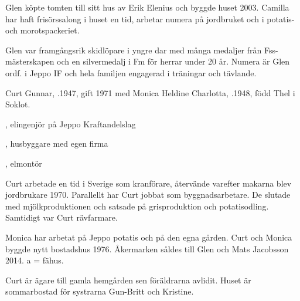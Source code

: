 Glen köpte tomten till sitt hus av Erik Elenius och byggde huset 2003. Camilla har haft frisörssalong i huset en tid, arbetar numera på jordbruket och i potatis- och morotspackeriet.

Glen var framgångsrik skidlöpare i yngre dar med många medaljer från Fss-mästerskapen och en silvermedalj i Fm för herrar under 20 år. Numera är Glen ordf. i Jeppo IF och hela familjen engagerad i träningar och tävlande.



%



%
Curt Gunnar, .1947, gift 1971 med Monica Heldine Charlotta, .1948, född Thel i Soklot.
\begin{jhchildren}
  \item {}, elingenjör på Jeppo Kraftandelslag
  \item {}, husbyggare med egen firma
  \item {}, elmontör
\end{jhchildren}

Curt arbetade en tid i Sverige som kranförare, återvände varefter makarna blev jordbrukare 1970. Parallellt har Curt jobbat som byggnadsarbetare. De slutade med mjölkproduktionen och satsade på grisproduktion och potatisodling. Samtidigt var Curt rävfarmare.

Monica har arbetat på Jeppo potatis och på den egna gården. Curt och Monica byggde nytt bostadshus 1976. Åkermarken såldes till Glen och Mats Jacobsson 2014. a = fähus.



%



%
Curt är ägare till gamla hemgården sen föräldrarna avlidit. Huset är sommarbostad för systrarna Gun-Britt och Kristine.\jhvspace{}


